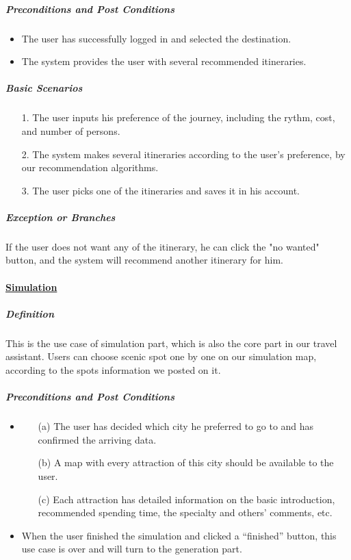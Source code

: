 \documentclass[10pt]{article}
\begin{document}
\begin{itemize}
		\subparagraph{Preconditions and Post Conditions}
		\begin{itemize}
			\item The user has successfully logged in and selected the destination.
			\item The system provides the user with several recommended itineraries.
		\end{itemize}

		\subparagraph{Basic Scenarios}
		\begin{itemize}
			\item[1.] The user inputs his preference of the journey, including the rythm, cost, and number of persons.
			\item[2.]The system makes several itineraries according to the user's preference, by our recommendation algorithms.
			\item[3.]The user picks one of the itineraries and saves it in his account.
		
		\end{itemize}

		\subparagraph{Exception or Branches}
		If the user does not want any of the itinerary, he can click the "no wanted" button, and the system will recommend another itinerary for him.

		\paragraph{\underline{Simulation}}
		\subparagraph{Definition}
		This is the use case of simulation part, which is also the core part in our travel assistant. Users can choose scenic spot one by one on our simulation map, according to the spots information we posted on it.

		\subparagraph{Preconditions and Post Conditions}
		\begin{itemize}
			\item \begin{itemize}
				\item[(a)] The user has decided which city he preferred to go to and has confirmed the arriving data.
				\item[(b)] A map with every attraction of this city should be available to the user.
				\item[(c)] Each attraction has detailed information on the basic introduction, recommended spending time, the specialty and others’ comments, etc. 
			\end{itemize}
			\item When the user finished the simulation and clicked a “finished” button, this use case is over and will turn to the generation part.
		\end{itemize}


\end{itemize}
\end{document}
